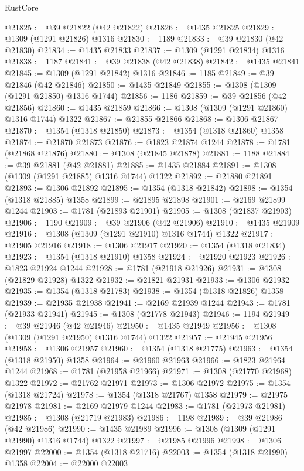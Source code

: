 \begin{lexlean}{RustCore}
\begin{coremodule}
@21825 := @39 @21822 (@42 @21822)
@21826 := @1435 @21825
@21829 := @1309 (@1291 @21826) @1316
@21830 := 1189
@21833 := @39 @21830 (@42 @21830)
@21834 := @1435 @21833
@21837 := @1309 (@1291 @21834) @1316
@21838 := 1187
@21841 := @39 @21838 (@42 @21838)
@21842 := @1435 @21841
@21845 := @1309 (@1291 @21842) @1316
@21846 := 1185
@21849 := @39 @21846 (@42 @21846)
@21850 := @1435 @21849
@21855 := @1308 (@1309 (@1291 @21850) @1316 @1744)
@21856 := 1186
@21859 := @39 @21856 (@42 @21856)
@21860 := @1435 @21859
@21866 := @1308 (@1309 (@1291 @21860) @1316 @1744) @1322
@21867 := @21855 @21866
@21868 := @1306 @21867
@21870 := @1354 (@1318 @21850)
@21873 := @1354 (@1318 @21860) @1358
@21874 := @21870 @21873
@21876 := @1823 @21874 @1244
@21878 := @1781 (@21868 @21876)
@21880 := @1308 (@21845 @21878)
@21881 := 1188
@21884 := @39 @21881 (@42 @21881)
@21885 := @1435 @21884
@21891 := @1308 (@1309 (@1291 @21885) @1316 @1744) @1322
@21892 := @21880 @21891
@21893 := @1306 @21892
@21895 := @1354 (@1318 @21842)
@21898 := @1354 (@1318 @21885) @1358
@21899 := @21895 @21898
@21901 := @2169 @21899 @1244
@21903 := @1781 (@21893 @21901)
@21905 := @1308 (@21837 @21903)
@21906 := 1190
@21909 := @39 @21906 (@42 @21906)
@21910 := @1435 @21909
@21916 := @1308 (@1309 (@1291 @21910) @1316 @1744) @1322
@21917 := @21905 @21916
@21918 := @1306 @21917
@21920 := @1354 (@1318 @21834)
@21923 := @1354 (@1318 @21910) @1358
@21924 := @21920 @21923
@21926 := @1823 @21924 @1244
@21928 := @1781 (@21918 @21926)
@21931 := @1308 (@21829 @21928) @1322
@21932 := @21821 @21931
@21933 := @1306 @21932
@21935 := @1354 (@1318 @21783)
@21938 := @1354 (@1318 @21826) @1358
@21939 := @21935 @21938
@21941 := @2169 @21939 @1244
@21943 := @1781 (@21933 @21941)
@21945 := @1308 (@21778 @21943)
@21946 := 1194
@21949 := @39 @21946 (@42 @21946)
@21950 := @1435 @21949
@21956 := @1308 (@1309 (@1291 @21950) @1316 @1744) @1322
@21957 := @21945 @21956
@21958 := @1306 @21957
@21960 := @1354 (@1318 @21775)
@21963 := @1354 (@1318 @21950) @1358
@21964 := @21960 @21963
@21966 := @1823 @21964 @1244
@21968 := @1781 (@21958 @21966)
@21971 := @1308 (@21770 @21968) @1322
@21972 := @21762 @21971
@21973 := @1306 @21972
@21975 := @1354 (@1318 @21724)
@21978 := @1354 (@1318 @21767) @1358
@21979 := @21975 @21978
@21981 := @2169 @21979 @1244
@21983 := @1781 (@21973 @21981)
@21985 := @1308 (@21719 @21983)
@21986 := 1198
@21989 := @39 @21986 (@42 @21986)
@21990 := @1435 @21989
@21996 := @1308 (@1309 (@1291 @21990) @1316 @1744) @1322
@21997 := @21985 @21996
@21998 := @1306 @21997
@22000 := @1354 (@1318 @21716)
@22003 := @1354 (@1318 @21990) @1358
@22004 := @22000 @22003

\end{coremodule}
\end{lexlean}
